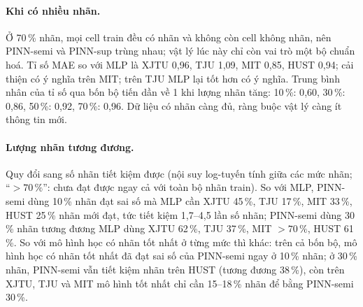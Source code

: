 \documentclass[12pt,a4paper,oneside]{report}
\theoremstyle{plain}
\theoremstyle{definition}
\begin{document}
\paragraph{Khi có nhiều nhãn.} Ở 70\,\% nhãn, mọi cell train đều có nhãn và không còn cell không nhãn, nên
PINN-semi và PINN-sup trùng nhau; vật lý lúc này chỉ còn vai trò một bộ chuẩn hoá. Tỉ số MAE so với MLP là
XJTU 0{,}96, TJU 1{,}09, MIT 0{,}85, HUST 0{,}94; cải thiện có ý nghĩa trên MIT; trên TJU MLP lại tốt hơn có ý nghĩa. Trung bình nhân của tỉ số qua bốn bộ tiến dần về 1 khi lượng nhãn tăng:
10\,\%: 0{,}60, 30\,\%: 0{,}86, 50\,\%: 0{,}92, 70\,\%: 0{,}96. Dữ liệu có nhãn càng đủ, ràng buộc vật lý càng ít thông tin mới.

\paragraph{Lượng nhãn tương đương.} Quy đổi sang số nhãn tiết kiệm được (nội suy log-tuyến tính giữa các mức nhãn; “$> 70\,\%$”: chưa đạt được ngay cả với toàn bộ nhãn train). So với MLP, PINN-semi dùng 10\,\% nhãn đạt sai số mà MLP cần XJTU 45\,\%, TJU 17\,\%, MIT 33\,\%, HUST 25\,\% nhãn mới đạt, tức tiết kiệm 1{,}7--4{,}5 lần số nhãn; PINN-semi dùng 30\,\% nhãn tương đương MLP dùng XJTU 62\,\%, TJU 37\,\%, MIT $> 70\,\%$, HUST 61\,\%. So với mô hình học có nhãn tốt nhất ở từng mức thì khác: trên cả bốn bộ, mô hình học có nhãn tốt nhất đã đạt sai số của PINN-semi ngay ở 10\,\% nhãn; ở 30\,\% nhãn, PINN-semi vẫn tiết kiệm nhãn trên HUST (tương đương 38\,\%), còn trên XJTU, TJU và MIT mô hình tốt nhất chỉ cần 15--18\,\% nhãn để bằng PINN-semi 30\,\%.
\end{document}
